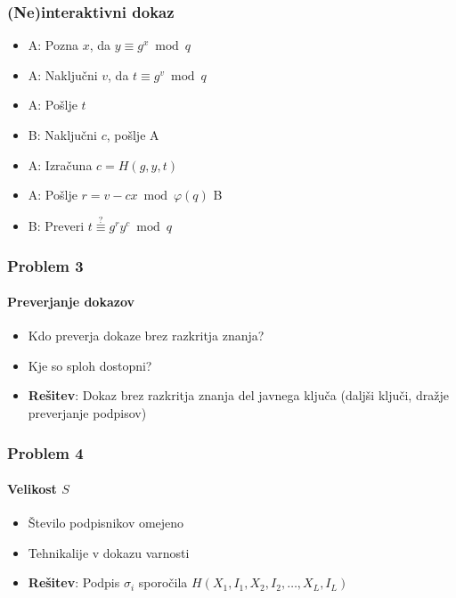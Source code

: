 \documentclass{beamer}    %
\begin{document}
\begin{frame}
    \frametitle{(Ne)interaktivni dokaz}
    \begin{itemize}
        \item A: Pozna $x$, da $y \equiv g^x \bmod q$
        \item A: Naključni $v$, da $t \equiv g^v \bmod q$
        \item A: Pošlje $t$
    \end{itemize}
    \vspace{1cm}
    \begin{multicols*}{2}
        \begin{itemize}
            \item B: Naključni $c$, pošlje A
        \end{itemize}
        \begin{itemize}
            \item A: Izračuna $c = H(g, y, t)$
        \end{itemize}
    \end{multicols*}
    \vspace{1cm}
    \begin{itemize}
        \item A: Pošlje $r = v - cx \bmod{\varphi(q)}$ B
        \item B: Preveri $t \stackrel{?}{\equiv} g^r y^c \bmod q$
    \end{itemize}
\end{frame}

\begin{frame}
    \frametitle{Problem 3}
    \framesubtitle{Preverjanje dokazov}
    \begin{itemize}
        \item Kdo preverja dokaze brez razkritja znanja?
        \item Kje so sploh dostopni?
        \vspace{1cm}
        \item \textbf{Rešitev}: Dokaz brez razkritja znanja del javnega ključa
            (daljši ključi, dražje preverjanje podpisov)
    \end{itemize}
\end{frame}

\begin{frame}
    \frametitle{Problem 4}
    \framesubtitle{Velikost $S$}
    \begin{itemize}
        \item Število podpisnikov omejeno
        \item Tehnikalije v dokazu varnosti
        \vspace{1cm}
        \item \textbf{Rešitev}: Podpis $\sigma_i$ sporočila 
            $H(X_1, I_1, X_2, I_2, \dots, X_L, I_L)$
    \end{itemize}
\end{frame}
\end{document}

